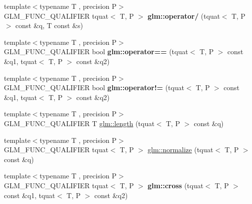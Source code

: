 \begin{DoxyCompactItemize}
\item 
\hypertarget{group__gtc__quaternion_gab52fd3ac627908aa2aa1df96ddcdd113}{{\footnotesize template$<$typename T , precision P$>$ }\\G\-L\-M\-\_\-\-F\-U\-N\-C\-\_\-\-Q\-U\-A\-L\-I\-F\-I\-E\-R tquat$<$ T, P $>$ {\bfseries glm\-::operator/} (tquat$<$ T, P $>$ const \&q, T const \&s)}\label{group__gtc__quaternion_gab52fd3ac627908aa2aa1df96ddcdd113}

\item 
\hypertarget{namespaceglm_aea4f3403a948c727fde4945f719913ea}{{\footnotesize template$<$typename T , precision P$>$ }\\G\-L\-M\-\_\-\-F\-U\-N\-C\-\_\-\-Q\-U\-A\-L\-I\-F\-I\-E\-R bool {\bfseries glm\-::operator==} (tquat$<$ T, P $>$ const \&q1, tquat$<$ T, P $>$ const \&q2)}\label{namespaceglm_aea4f3403a948c727fde4945f719913ea}

\item 
\hypertarget{namespaceglm_a5390634e3339760a2c04f6b1fabefd2e}{{\footnotesize template$<$typename T , precision P$>$ }\\G\-L\-M\-\_\-\-F\-U\-N\-C\-\_\-\-Q\-U\-A\-L\-I\-F\-I\-E\-R bool {\bfseries glm\-::operator!=} (tquat$<$ T, P $>$ const \&q1, tquat$<$ T, P $>$ const \&q2)}\label{namespaceglm_a5390634e3339760a2c04f6b1fabefd2e}

\item 
{\footnotesize template$<$typename T , precision P$>$ }\\G\-L\-M\-\_\-\-F\-U\-N\-C\-\_\-\-Q\-U\-A\-L\-I\-F\-I\-E\-R T \hyperlink{group__gtc__quaternion_gac682181783027544c8d251b4d3a60cf8}{glm\-::length} (tquat$<$ T, P $>$ const \&q)
\item 
{\footnotesize template$<$typename T , precision P$>$ }\\G\-L\-M\-\_\-\-F\-U\-N\-C\-\_\-\-Q\-U\-A\-L\-I\-F\-I\-E\-R tquat$<$ T, P $>$ \hyperlink{group__gtc__quaternion_ga35b6bcb22ac6d1e4a85440f5b69bdf86}{glm\-::normalize} (tquat$<$ T, P $>$ const \&q)
\item 
\hypertarget{namespaceglm_ae21800a9767f21b7649c196485d924b4}{{\footnotesize template$<$typename T , precision P$>$ }\\G\-L\-M\-\_\-\-F\-U\-N\-C\-\_\-\-Q\-U\-A\-L\-I\-F\-I\-E\-R tquat$<$ T, P $>$ {\bfseries glm\-::cross} (tquat$<$ T, P $>$ const \&q1, tquat$<$ T, P $>$ const \&q2)}\label{namespaceglm_ae21800a9767f21b7649c196485d924b4}


\end{DoxyCompactItemize}
